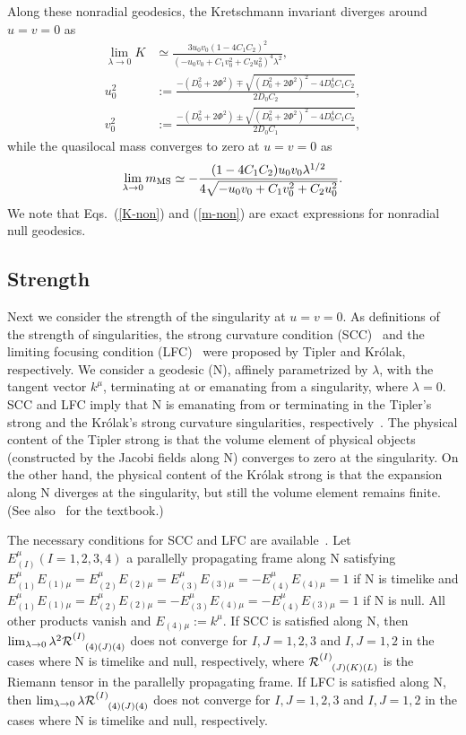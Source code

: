 \documentclass[aps,prd,twocolumn,eqsecnum,showpacs,amsmath]{revtex4}
\begin{document}
Along these nonradial geodesics, the Kretschmann invariant diverges around $u=v=0$ as
\begin{align}
\lim_{\lambda \to 0}K &\simeq \frac{3u_0v_0(1-4C_1C_2)^2}{(-u_0v_0+C_1v_0^2+C_2u_0^2)^4\lambda^2}, \label{K-non}\\
u_0^2&:=\frac{-(D_0^2+2\Phi^2)\mp\sqrt{(D_0^2+2\Phi^2)^2-4D_0^4C_1C_2}}{2D_0C_2}, \label{u0} \\
v_0^2&:=\frac{-(D_0^2+2\Phi^2)\pm\sqrt{(D_0^2+2\Phi^2)^2-4D_0^4C_1C_2}}{2D_0C_1}, \label{v0}
\end{align}
while the quasilocal mass converges to zero at $u=v=0$ as
\begin{eqnarray}
\lim_{\lambda \to 0}m_{\rm MS} \simeq-\frac{(1-4C_1C_2)u_0v_0\lambda^{1/2}}{4\sqrt{-u_0v_0+C_1v_0^2+C_2u_0^2}}. \label{m-non}
\end{eqnarray}
We note that Eqs.~(\ref{K-non}) and (\ref{m-non}) are exact expressions for nonradial null geodesics.




\subsection{Strength}
Next we consider the strength of the singularity at $u=v=0$.
As definitions of the strength of singularities, the strong curvature condition (SCC)~\cite{Tipler} and the limiting focusing condition (LFC)~\cite{Krolak} were proposed by Tipler and Kr\'{o}lak, respectively.
We consider a geodesic (N), affinely parametrized by $\lambda$, with the tangent vector $k^\mu$, terminating at or emanating from a singularity, where $\lambda=0$.
SCC and LFC imply that N is emanating from or terminating in the Tipler's strong and the Kr\'{o}lak's strong curvature singularities, respectively~\cite{ClarkeKrolak}.
The physical content of the Tipler strong is that the volume element of physical objects (constructed by the Jacobi fields along N) converges to zero at the singularity.
On the other hand, the physical content of the Kr\'{o}lak strong is that the expansion along N diverges at the singularity, but still the volume element remains finite.
(See also~\cite{Joshi,Clarketext} for the textbook.)

The necessary conditions for SCC and LFC are available~\cite{ClarkeKrolak}.
Let $E_{(I)}^\mu (I=1,2,3,4)$ a parallelly propagating frame along N satisfying $E^\mu_{(1)}E_{(1)\mu}=E^\mu_{(2)}E_{(2)\mu}=E^\mu_{(3)}E_{(3)\mu}=-E^\mu_{(4)}E_{(4)\mu}=1$ if N is timelike and $E^\mu_{(1)}E_{(1)\mu}=E^\mu_{(2)}E_{(2)\mu}=-E^\mu_{(3)}E_{(4)\mu}=-E^\mu_{(4)}E_{(3)\mu}=1$ if N is null.
All other products vanish and $E_{(4)\mu}:=k^\mu$.
If SCC is satisfied along N, then $\lim_{\lambda \to 0}\lambda^2{\cal R}^{(I)}_{~~~(4)(J)(4)}$ does not converge for $I,J=1,2,3$ and $I,J=1,2$ in the cases where N is timelike and null, respectively, where ${\cal R}^{(I)}_{~~~(J)(K)(L)}$ is the Riemann tensor in the parallelly propagating frame.
If LFC is satisfied along N, then $\lim_{\lambda \to 0}\lambda {\cal R}^{(I)}_{~~~(4)(J)(4)}$ does not converge for $I,J=1,2,3$ and $I,J=1,2$ in the cases where N is timelike and null, respectively.
\end{document}

